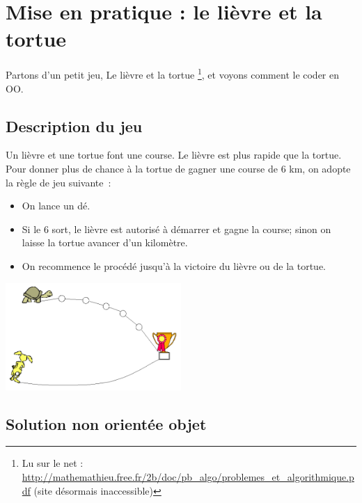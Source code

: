 \clearpage	
\section{Mise en pratique : le lièvre et la tortue}

	Partons d'un petit jeu, \og{}Le lièvre et la tortue\fg{}%
	\footnote{%
		Lu sur le net : 
		\url{http://mathemathieu.free.fr/2b/doc/pb_algo/problemes_et_algorithmique.pdf} (site désormais inaccessible)%
	}, 
	et voyons comment le coder en OO.

	\subsection{Description du jeu}

		\newcommand{\nbMaxKmTortue}{6}
		Un lièvre et une tortue font une course.
		Le lièvre est plus rapide que la tortue.
		Pour donner plus de chance à la tortue de gagner une course de \nbMaxKmTortue{} km, 
		on adopte la règle de jeu suivante~:
		\begin{itemize}
		\item 
			On lance un dé. 
		\item
			Si le 6 sort, 
			le lièvre est autorisé à démarrer et gagne la course; 
			sinon on laisse la tortue avancer d’un kilomètre.
		\item
			On recommence le procédé jusqu'à la victoire du lièvre ou de la tortue.
		\end{itemize}
		
		\begin{center}
			\includegraphics[width=0.5\textwidth]{image/lievre-tortue}
		\end{center}
		
	\subsection{Solution non orientée objet}
	
